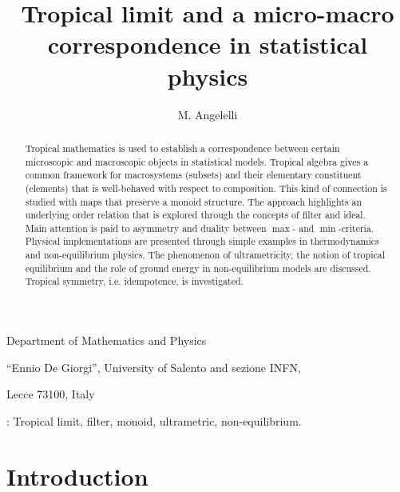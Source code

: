 \documentclass[11pt,british,reqno]{article}
\date{}
\numberwithin{equation}{section}
\numberwithin{figure}{section}
\numberwithin{table}{section}
\theoremstyle{definition}
\theoremstyle{definition}
\theoremstyle{plain}
\theoremstyle{plain}
\theoremstyle{remark}
\theoremstyle{plain}
\numberwithin{equation}{section}
\numberwithin{figure}{section}
\numberwithin{table}{section}
\theoremstyle{plain}
\begin{document}
\title{Tropical limit and a micro-macro correspondence in statistical physics}

\author{M. Angelelli}
\maketitle
\begin{center}
Department of Mathematics and Physics 
\par\end{center}

\begin{center}
``Ennio De Giorgi'', University of Salento and sezione INFN, 
\par\end{center}

\begin{center}
Lecce 73100, Italy 
\par\end{center}


\begin{abstract}

Tropical mathematics is used to establish a correspondence between certain microscopic and macroscopic objects in statistical models. Tropical algebra gives a common framework for macrosystems (subsets) and their elementary
constituent (elements) that is well-behaved with respect to composition. This kind of connection is studied with maps that preserve a monoid structure. The approach highlights an underlying order relation that is explored through the concepts of filter and ideal. Main attention is paid to asymmetry and duality between $\max$- and $\min$-criteria. Physical implementations are presented through simple examples in thermodynamics and non-equilibrium physics. The phenomenon of ultrametricity, the notion of tropical equilibrium and the role of ground energy in non-equilibrium models are discussed. Tropical symmetry, i.e. idempotence, is investigated.  

\end{abstract}

\vspace{2pc}
: Tropical limit, filter, monoid, ultrametric, non-equilibrium. 




\section{Introduction}
\end{document}
